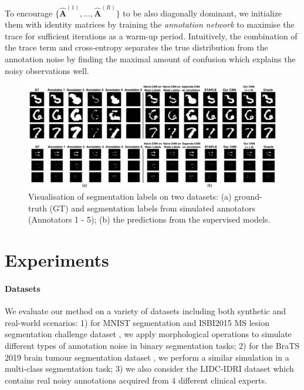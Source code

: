 To encourage $\{\hat{\mathbf{A}}^{(1)}, ..., \hat{\mathbf{A}}^{(R)}\}$ to be also diagonally dominant, we initialize them with identity matrices by training the \textit{annotation network} to maximise the trace for sufficient iterations as a warm-up period. Intuitively, the combination of the trace term and cross-entropy separates the true distribution from the annotation noise by finding the maximal amount of confusion which explains the noisy observations well. 

\begin{figure}[t]
    \centering
    \vspace{-5mm}
    \includegraphics[width=\linewidth]{chapter_8_neurips/picture11.png}
    \vspace{-3mm}
    \caption{\footnotesize Visualisation of segmentation labels on two datasets: (a) ground-truth (GT) and segmentation labels from simulated annotators (Annotators 1 - 5); (b) the predictions from the supervised models.}
    \label{MNIST and MS segmentation results}
    \vspace{-2mm}
\end{figure}


\section{Experiments}

\paragraph{Datasets}
We evaluate our method on a variety of datasets including both synthetic and real-world scenarios: 1) for MNIST segmentation and ISBI2015 MS lesion segmentation challenge dataset \cite{jesson2015hierarchical}, we apply morphological operations to simulate different types of annotation noise in binary segmentation tasks; 2) for the BraTS 2019 brain tumour segmentation dataset \cite{menze2014multimodal}, we perform a similar simulation in a multi-class segmentation task; 3) we also consider the LIDC-IDRI dataset which contains real noisy annotations acquired from 4 different clinical experts. 

